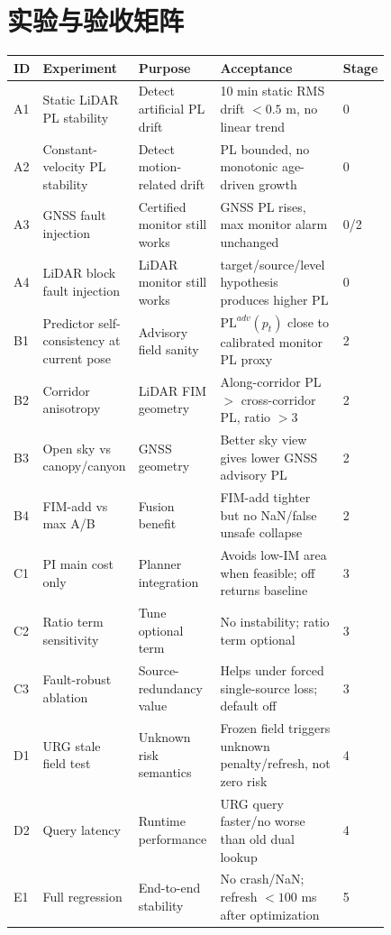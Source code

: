 \documentclass[11pt,a4paper]{article}
\newcommand{\PL}{\mathrm{PL}}
\begin{document}
\section{实验与验收矩阵}

\begin{center}
\scriptsize
\begin{longtable}{@{}P{0.05\linewidth}P{0.17\linewidth}P{0.22\linewidth}P{0.34\linewidth}P{0.05\linewidth}@{}}
  \toprule
  \textbf{ID} & \textbf{Experiment} & \textbf{Purpose} & \textbf{Acceptance} & \textbf{Stage} \\
  \midrule
  A1 & Static LiDAR PL stability & Detect artificial PL drift & 10 min static RMS drift $<0.5$ m, no linear trend & 0 \\
  A2 & Constant-velocity PL stability & Detect motion-related drift & PL bounded, no monotonic age-driven growth & 0 \\
  A3 & GNSS fault injection & Certified monitor still works & GNSS PL rises, max monitor alarm unchanged & 0/2 \\
  A4 & LiDAR block fault injection & LiDAR monitor still works & target/source/level hypothesis produces higher PL & 0 \\
  B1 & Predictor self-consistency at current pose & Advisory field sanity & $\PL^{adv}(p_t)$ close to calibrated monitor PL proxy & 2 \\
  B2 & Corridor anisotropy & LiDAR FIM geometry & Along-corridor PL $>$ cross-corridor PL, ratio $>3$ & 2 \\
  B3 & Open sky vs canopy/canyon & GNSS geometry & Better sky view gives lower GNSS advisory PL & 2 \\
  B4 & FIM-add vs max A/B & Fusion benefit & FIM-add tighter but no NaN/false unsafe collapse & 2 \\
  C1 & PI main cost only & Planner integration & Avoids low-IM area when feasible; off returns baseline & 3 \\
  C2 & Ratio term sensitivity & Tune optional term & No instability; ratio term optional & 3 \\
  C3 & Fault-robust ablation & Source-redundancy value & Helps under forced single-source loss; default off & 3 \\
  D1 & URG stale field test & Unknown risk semantics & Frozen field triggers unknown penalty/refresh, not zero risk & 4 \\
  D2 & Query latency & Runtime performance & URG query faster/no worse than old dual lookup & 4 \\
  E1 & Full regression & End-to-end stability & No crash/NaN; refresh $<100$ ms after optimization & 5 \\
  \bottomrule
\end{longtable}
\end{center}
\end{document}
